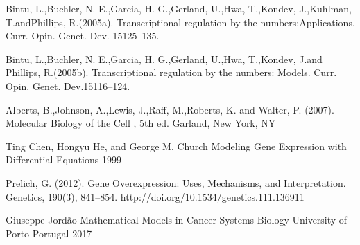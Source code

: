 
\begin{thebibliography}{00}

Bintu, L.,Buchler, N. E.,Garcia, H. G.,Gerland, U.,Hwa, T.,Kondev, J.,Kuhlman, T.andPhillips, R.(2005a). 
\newblock Transcriptional regulation by the numbers:Applications. 
\newblock Curr. Opin. Genet. Dev. 15125–135.

Bintu, L.,Buchler, N. E.,Garcia, H. G.,Gerland, U.,Hwa, T.,Kondev, J.and Phillips, R.(2005b). 
\newblock Transcriptional regulation by the numbers: Models.
\newblock Curr. Opin. Genet. Dev.15116–124.

Alberts, B.,Johnson, A.,Lewis, J.,Raff, M.,Roberts, K. and Walter, P. (2007).
\newblock Molecular Biology of the Cell
\newblock , 5th ed. Garland, New York, NY

Ting Chen, Hongyu He, and George M. Church
\newblock Modeling Gene Expression with Differential Equations 1999

Prelich, G. (2012). 
\newblock Gene Overexpression: Uses, Mechanisms, and Interpretation. 
\newblock Genetics, 190(3), 841–854. http://doi.org/10.1534/genetics.111.136911

 Giuseppe Jordão
\newblock Mathematical Models in Cancer Systems Biology
\newblock University of Porto Portugal 2017

\end{thebibliography}

